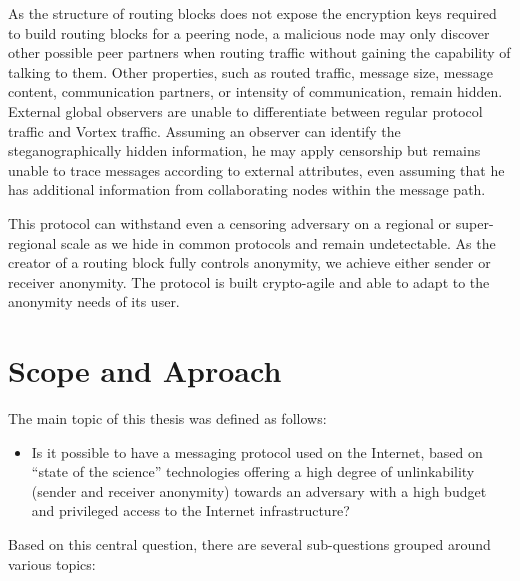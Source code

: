 As the structure of routing blocks does not expose the encryption keys required to build routing blocks for a peering node, a malicious node may only discover other possible peer partners when routing traffic without gaining the capability of talking to them. Other properties, such as routed traffic, message size, message content, communication partners, or intensity of communication, remain hidden. External global observers are unable to differentiate between regular protocol traffic and Vortex traffic. Assuming an observer can identify the steganographically hidden information, he may apply censorship but remains unable to trace messages according to external attributes, even assuming that he has additional information from collaborating nodes within the message path.

This protocol can withstand even a censoring adversary on a regional or super-regional scale as we hide in common protocols and remain undetectable. As the creator of a routing block fully controls anonymity, we achieve either sender or receiver anonymity. The protocol is built crypto-agile and able to adapt to the anonymity needs of its user.

\chapter{Scope and Aproach}
The main topic of this thesis was defined as follows:

\begin{itemize}
	\item Is it possible to have a messaging protocol used on the Internet, based on ``state of the science'' technologies offering a high degree of unlinkability (sender and receiver anonymity) towards an adversary with a high budget and privileged access to the Internet infrastructure?
\end{itemize}

Based on this central question, there are several sub-questions grouped around various topics:

